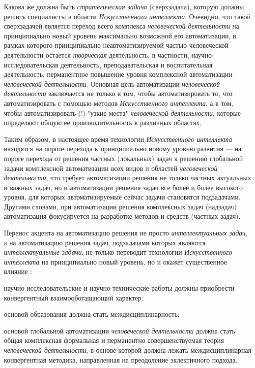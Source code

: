 Какова же должна быть \textit{стратегическая задача} (сверхзадача), которую должны решить специалисты в области \textit{Искусственного интеллекта}. Очевидно, что такой сверхзадачей является переход всего комплекса \textit{человеческой деятельности} на принципиально новый уровень максимально возможной его автоматизации, в рамках которого принципиально неавтоматизируемой частью человеческой деятельности остается \textit{творческая} деятельность, в частности, научно-исследовательская деятельность, преподавательская и воспитательная деятельность, перманентное повышение уровня комплексной автоматизации \textit{человеческой деятельности}. Основная цель  автоматизации \textit{человеческой деятельности} заключается не только в том, чтобы автоматизировать то, что  автоматизировать с помощью методов \textit{Искусственного интеллекта}, а в том, чтобы автоматизировать (!) "узкие места"{} \textit{человеческой деятельности}, которые определяют общую ее производительность в различных областях.

Таким образом, в настоящее время технологии \textit{Искусственного интеллекта} находятся на пороге перехода к принципиально новому уровню развития --- на пороге перехода от решения частных (локальных) задач к решению глобальной задачи комплексной автоматизации всех видов и областей \textit{человеческой деятельности}, что требует автоматизации решения не только частных актуальных и важных задач, но и автоматизации решения задач все более и более высокого уровня, для которых автоматизируемые сейчас задачи становятся подзадачами. Другими словами, при автоматизации решения комплексных задач (надзадач) автоматизация фокусируется на разработке методов и средств  (частных задач).

Перенос акцента на автоматизацию решения не просто \textit{интеллектуальных задач}, а на автоматизацию решения  задач, подзадачами которых являются  \textit{интеллектуальные задачи}, не только переводит технологии \textit{Искусственного интеллекта} на принципиально новый уровень, но и окажет существенное влияние :
\begin{textitemize}
	\item  научно-исследовательские и научно-технические работы должны приобрести конвергентный взаимообогащающий характер;
	\item основой образования должна стать междисциплинарность;
	\item основой глобальной автоматизации \textit{человеческой деятельности} должна стать общая комплексная формальная и перманентно совершенствуемая теория \textit{человеческой деятельности}, в основе которой должна лежать междисциплинарная конвергентная методика, направленная на преодоление эклектичного подхода.
\end{textitemize}

